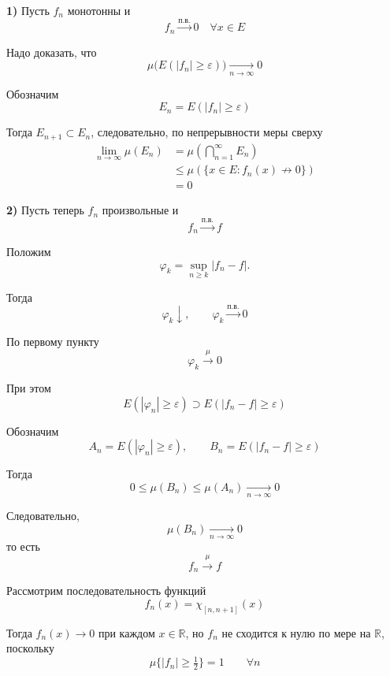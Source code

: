 \documentclass[12pt,a4paper]{article}
\begin{document}
\begin{proofbox}{}
    \textbf{1)} Пусть $f_n$ монотонны и
    \[
        f_n\xrightarrow{\text{п.в.}}0
        \quad \forall x\in E
    \]

    Надо доказать, что
    \[
        \mu\bigl(E(|f_n|\geqslant\varepsilon)\bigr)
        \xrightarrow[n\to\infty]{}0
    \]

    Обозначим
    \[
        E_n=E(|f_n|\geqslant\varepsilon)
    \]

    Тогда $E_{n+1}\subset E_n$, следовательно, по непрерывности меры сверху
    \[
        \begin{aligned}
        \lim_{n\to\infty}\mu(E_n)
        &=\mu\left(\bigcap_{n=1}^{\infty}E_n\right)\\
        &\leq\mu\left(\{x\in E:f_n(x)\not\to0\}\right)\\
        &=0
        \end{aligned}
    \]

    \textbf{2)} Пусть теперь $f_n$ произвольные и
    \[
        f_n\xrightarrow{\text{п.в.}}f
    \]

    Положим
    \[
        \varphi_k=\sup_{n\geqslant k}|f_n-f|.
    \]

    Тогда
    \[
        \varphi_k\downarrow,
        \qquad
        \varphi_k\xrightarrow{\text{п.в.}}0
    \]

    По первому пункту
    \[
        \varphi_k\xrightarrow{\mu}0
    \]

    При этом
    \[
        E(|\varphi_n|\geqslant\varepsilon)
        \supset
        E(|f_n-f|\geqslant\varepsilon)
    \]

    Обозначим
    \[
        A_n=E(|\varphi_n|\geqslant\varepsilon),
        \qquad
        B_n=E(|f_n-f|\geqslant\varepsilon)
    \]

    Тогда
    \[
        0\leqslant\mu(B_n)\leqslant\mu(A_n)
        \xrightarrow[n\to\infty]{}0
    \]

    Следовательно,
    \[
        \mu(B_n)\xrightarrow[n\to\infty]{}0
    \]
    то есть
    \[
        f_n\xrightarrow{\mu}f
    \]
\end{proofbox}

\begin{example}
    Рассмотрим последовательность функций
    \[
        f_n(x)=\chi_{[n,n+1]}(x)
    \]

    Тогда $f_n(x)\to0$ при каждом $x\in\mathbb R$,
    но $f_n$ не сходится к нулю по мере на $\mathbb R$, поскольку
    \[
        \mu\{|f_n|\geqslant\tfrac12\}=1
        \qquad \forall n
    \]
\end{example}
\end{document}

